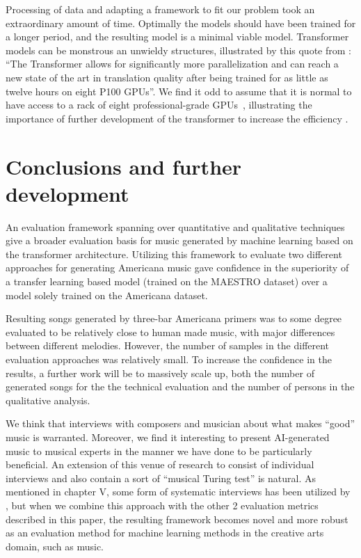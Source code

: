\documentclass{IEEEtran}
\begin{document}
Processing of data and adapting a framework to fit our problem 
took an extraordinary amount of time. Optimally the models should have been
trained for a longer period, and the resulting model is a minimal viable model.
Transformer models can be monstrous 
an unwieldy structures, illustrated by this quote from
\citeauthor{vaswani2017attention}: ``The Transformer allows for significantly
more parallelization and can reach a new state of the art in translation
quality after being trained for as little as twelve hours on eight P100 GPUs''.
We find it odd to assume that it is normal to have access to a rack of eight 
professional-grade GPUs~\cite{vaswani2017attention}, illustrating the importance
of further development of the transformer to increase the efficiency 
\cite{kitaev2020reformer}.

\section{Conclusions and further development}

An evaluation framework spanning over quantitative and qualitative techniques
give a broader evaluation basis for music generated by machine learning 
based on the transformer architecture. Utilizing this framework to evaluate two different 
approaches for generating Americana music gave confidence in the superiority of a 
transfer learning based model (trained on the MAESTRO dataset) over a model solely
trained on the Americana dataset.

Resulting songs generated by three-bar Americana primers was to some degree evaluated to 
be relatively close to human made music, with major differences between different melodies.
However, the number of samples in the different evaluation approaches was relatively small. 
To increase the confidence in the results, a further work will be to massively scale up, both the 
number of generated songs for the the technical evaluation and the number of persons in the 
qualitative analysis.

We think that interviews with composers and musician about what makes ``good'' music 
is warranted. Moreover, we find it interesting to present AI-generated 
music to musical experts in the manner we have done to be particularly beneficial. 
An extension of this venue of research to consist of individual interviews
and also contain a sort of ``musical Turing test'' is natural. As mentioned in 
chapter V, some form of systematic interviews has been utilized by \citeauthor{sturm2017taking} 
\cite{sturm2017taking}, but when we combine this approach with the other 2 evaluation
metrics described in this paper, the resulting framework becomes novel and more robust as an
evaluation method for machine learning methods in the creative arts domain, such as music.

\vspace{3em}

\printbibliography
\end{document}
